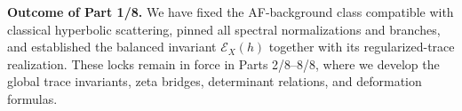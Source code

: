 
\noindent\textbf{Outcome of Part 1/8.}
We have fixed the AF-background class compatible with classical
hyperbolic scattering, pinned all spectral normalizations and branches,
and established the balanced invariant $\mathcal{E}_X(h)$ together with
its regularized-trace realization. These locks remain in force in Parts
2/8–8/8, where we develop the global trace invariants, zeta bridges,
determinant relations, and deformation formulas.                               %



